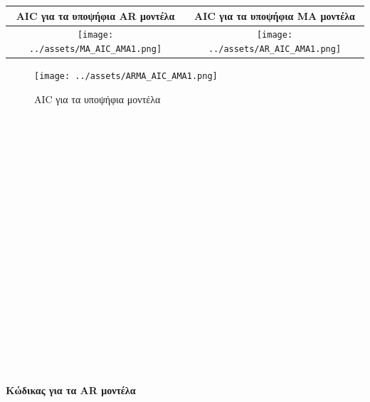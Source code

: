 \documentclass[11pt,]{article}
\let\oldparagraph\paragraph
\renewcommand{\paragraph}[1]{\oldparagraph{#1}\mbox{}}
\begin{document}
\begin{longtable}[]{@{}cc@{}}
\toprule
AIC για τα υποψήφια AR μοντέλα & AIC για τα υποψήφια MA
μοντέλα\tabularnewline
\midrule
\endhead
\texttt{[image: ../assets/MA\_AIC\_AMA1.png]}
&
\texttt{[image: ../assets/AR\_AIC\_AMA1.png]}\tabularnewline
\bottomrule
\end{longtable}

\begin{figure}
\centering
\texttt{[image: ../assets/ARMA\_AIC\_AMA1.png]}
\caption{AIC για τα υποψήφια μοντέλα}
\end{figure}

~

~

~

~

~

~

~

~

~

~

~

\hypertarget{ux3baux3ceux3b4ux3b9ux3baux3b1ux3c2-ux3b3ux3b9ux3b1-ux3c4ux3b1-ar-ux3bcux3bfux3bdux3c4ux3adux3bbux3b1}{%
\paragraph{Κώδικας για τα AR
μοντέλα}\label{ux3baux3ceux3b4ux3b9ux3baux3b1ux3c2-ux3b3ux3b9ux3b1-ux3c4ux3b1-ar-ux3bcux3bfux3bdux3c4ux3adux3bbux3b1}}
\end{document}
